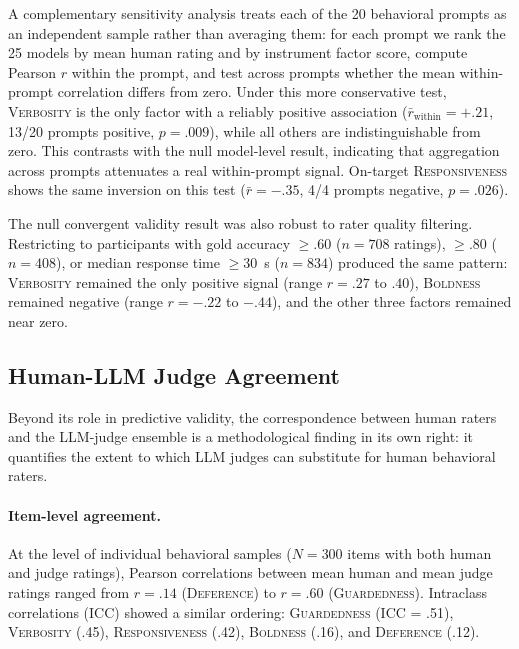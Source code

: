 \documentclass[11pt]{article}
\newcommand{\factorname}[1]{\textsc{#1}}
\begin{document}
A complementary sensitivity analysis treats each of the 20 behavioral prompts as an independent sample rather than averaging them: for each prompt we rank the 25 models by mean human rating and by instrument factor score, compute Pearson $r$ within the prompt, and test across prompts whether the mean within-prompt correlation differs from zero.
Under this more conservative test, \factorname{Verbosity} is the only factor with a reliably positive association ($\bar{r}_{\text{within}} = +.21$, 13/20 prompts positive, $p = .009$), while all others are indistinguishable from zero. This contrasts with the null model-level result, indicating that aggregation across prompts attenuates a real within-prompt signal.
On-target \factorname{Responsiveness} shows the same inversion on this test ($\bar{r} = -.35$, 4/4 prompts negative, $p = .026$).

The null convergent validity result was also robust to rater quality filtering.
Restricting to participants with gold accuracy $\geq .60$ ($n = 708$ ratings), $\geq .80$ ($n = 408$), or median response time $\geq 30$~s ($n = 834$) produced the same pattern: \factorname{Verbosity} remained the only positive signal (range $r = .27$ to $.40$), \factorname{Boldness} remained negative (range $r = -.22$ to $-.44$), and the other three factors remained near zero.

\subsection{Human-LLM Judge Agreement}
\label{sec:human-judge}

Beyond its role in predictive validity, the correspondence between human raters and the LLM-judge ensemble is a methodological finding in its own right: it quantifies the extent to which LLM judges can substitute for human behavioral raters.

\paragraph{Item-level agreement.}
At the level of individual behavioral samples ($N = 300$ items with both human and judge ratings), Pearson correlations between mean human and mean judge ratings ranged from $r = .14$ (\factorname{Deference}) to $r = .60$ (\factorname{Guardedness}).
Intraclass correlations (ICC) showed a similar ordering: \factorname{Guardedness} (ICC = .51), \factorname{Verbosity} (.45), \factorname{Responsiveness} (.42), \factorname{Boldness} (.16), and \factorname{Deference} (.12).
\end{document}
